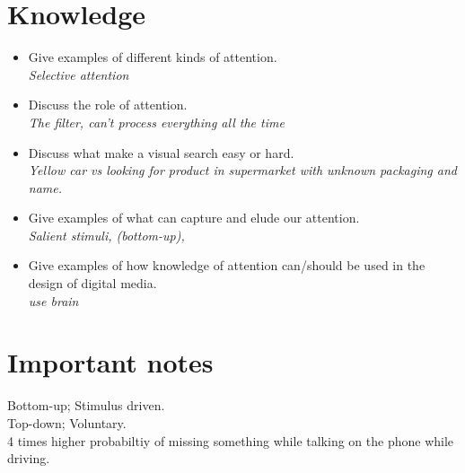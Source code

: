 \documentclass{article}
\begin{document}
\section{Knowledge}
\begin{itemize}
  \item Give examples of different kinds of attention.\\
    \textit{Selective attention}
  \item Discuss the role of attention.\\
    \textit{The filter, can't process everything all the time}
  \item Discuss what make a visual search easy or hard.\\
    \textit{Yellow car vs looking for product in supermarket with unknown packaging and name.}
  \item Give examples of what can capture and elude our attention.\\
    \textit{Salient stimuli, (bottom-up), }
  \item Give examples of how knowledge of attention can/should be used in the design of digital media.\\
    \textit{use brain}
\end{itemize}

\section{Important notes}
Bottom-up; Stimulus driven.\\
Top-down; Voluntary.\\ 
4 times higher probabiltiy of missing something while talking on the phone while driving.\\
\end{document}
